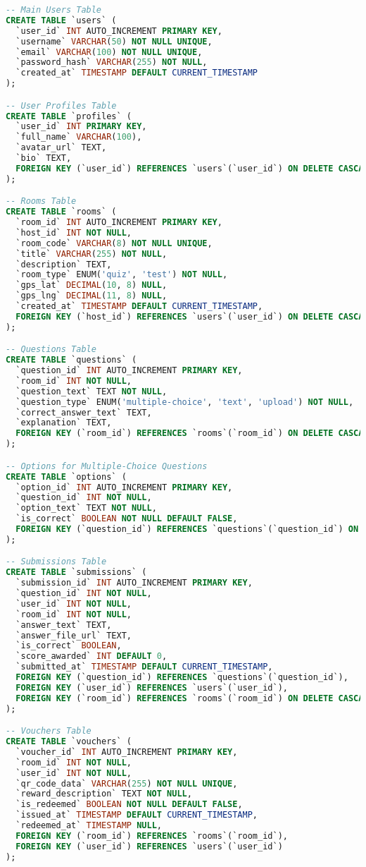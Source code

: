 \begin{lstlisting}[language=SQL, caption={Full Database SQL Schema for TEKUTOKO}]
-- Main Users Table
CREATE TABLE `users` (
  `user_id` INT AUTO_INCREMENT PRIMARY KEY,
  `username` VARCHAR(50) NOT NULL UNIQUE,
  `email` VARCHAR(100) NOT NULL UNIQUE,
  `password_hash` VARCHAR(255) NOT NULL,
  `created_at` TIMESTAMP DEFAULT CURRENT_TIMESTAMP
);

-- User Profiles Table
CREATE TABLE `profiles` (
  `user_id` INT PRIMARY KEY,
  `full_name` VARCHAR(100),
  `avatar_url` TEXT,
  `bio` TEXT,
  FOREIGN KEY (`user_id`) REFERENCES `users`(`user_id`) ON DELETE CASCADE
);

-- Rooms Table
CREATE TABLE `rooms` (
  `room_id` INT AUTO_INCREMENT PRIMARY KEY,
  `host_id` INT NOT NULL,
  `room_code` VARCHAR(8) NOT NULL UNIQUE,
  `title` VARCHAR(255) NOT NULL,
  `description` TEXT,
  `room_type` ENUM('quiz', 'test') NOT NULL,
  `gps_lat` DECIMAL(10, 8) NULL,
  `gps_lng` DECIMAL(11, 8) NULL,
  `created_at` TIMESTAMP DEFAULT CURRENT_TIMESTAMP,
  FOREIGN KEY (`host_id`) REFERENCES `users`(`user_id`) ON DELETE CASCADE
);

-- Questions Table
CREATE TABLE `questions` (
  `question_id` INT AUTO_INCREMENT PRIMARY KEY,
  `room_id` INT NOT NULL,
  `question_text` TEXT NOT NULL,
  `question_type` ENUM('multiple-choice', 'text', 'upload') NOT NULL,
  `correct_answer_text` TEXT,
  `explanation` TEXT,
  FOREIGN KEY (`room_id`) REFERENCES `rooms`(`room_id`) ON DELETE CASCADE
);

-- Options for Multiple-Choice Questions
CREATE TABLE `options` (
  `option_id` INT AUTO_INCREMENT PRIMARY KEY,
  `question_id` INT NOT NULL,
  `option_text` TEXT NOT NULL,
  `is_correct` BOOLEAN NOT NULL DEFAULT FALSE,
  FOREIGN KEY (`question_id`) REFERENCES `questions`(`question_id`) ON DELETE CASCADE
);

-- Submissions Table
CREATE TABLE `submissions` (
  `submission_id` INT AUTO_INCREMENT PRIMARY KEY,
  `question_id` INT NOT NULL,
  `user_id` INT NOT NULL,
  `room_id` INT NOT NULL,
  `answer_text` TEXT,
  `answer_file_url` TEXT,
  `is_correct` BOOLEAN,
  `score_awarded` INT DEFAULT 0,
  `submitted_at` TIMESTAMP DEFAULT CURRENT_TIMESTAMP,
  FOREIGN KEY (`question_id`) REFERENCES `questions`(`question_id`),
  FOREIGN KEY (`user_id`) REFERENCES `users`(`user_id`),
  FOREIGN KEY (`room_id`) REFERENCES `rooms`(`room_id`) ON DELETE CASCADE
);

-- Vouchers Table
CREATE TABLE `vouchers` (
  `voucher_id` INT AUTO_INCREMENT PRIMARY KEY,
  `room_id` INT NOT NULL,
  `user_id` INT NOT NULL,
  `qr_code_data` VARCHAR(255) NOT NULL UNIQUE,
  `reward_description` TEXT NOT NULL,
  `is_redeemed` BOOLEAN NOT NULL DEFAULT FALSE,
  `issued_at` TIMESTAMP DEFAULT CURRENT_TIMESTAMP,
  `redeemed_at` TIMESTAMP NULL,
  FOREIGN KEY (`room_id`) REFERENCES `rooms`(`room_id`),
  FOREIGN KEY (`user_id`) REFERENCES `users`(`user_id`)
);


\end{lstlisting}
